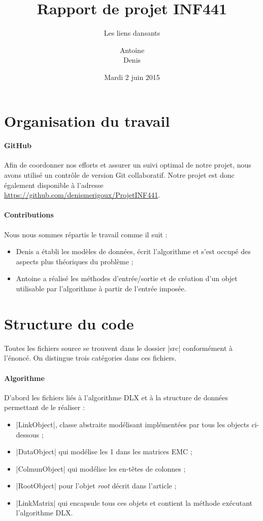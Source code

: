 \documentclass[11pt,french,a4paper]{article}
\title{Rapport de projet INF441}
\subtitle{Les liens dansants}
\author{Antoine \bsc{Berthier}\\ Denis \bsc{Merigoux}}
\date{Mardi 2 juin 2015}
\begin{document}
\maketitle

\section{Organisation du travail}

\paragraph{GitHub} Afin de coordonner nos efforts et assurer un suivi optimal de notre projet, nous avons utilisé un contrôle de version Git collaboratif. Notre projet est donc également disponible à l'adresse \url{https://github.com/denismerigoux/ProjetINF441}.

\paragraph{Contributions} Nous nous sommes répartis le travail comme il suit :
\begin{itemize}
	\item Denis a établi les modèles de données, écrit l'algorithme et s'est occupé des aspects plus théoriques du problème ;
	\item Antoine a réalisé les méthodes d'entrée/sortie et de création d'un objet utilisable par l'algorithme à partir de l'entrée imposée.
\end{itemize}

\section{Structure du code}

Toutes les fichiers source se trouvent dans le dossier |src| conformément à l'énoncé. On distingue trois catégories dans ces fichiers.

\paragraph{Algorithme} D'abord les fichiers liés à l'algorithme DLX et à la structure de données permettant de le réaliser :
\begin{itemize}
	\item |LinkObject|, classe abstraite modélisant implémentées par tous les objects ci-dessous ;
	\item |DataObject| qui modélise les 1 dans les matrices EMC ;
	\item |ColmunObject| qui modélise les en-têtes de colonnes ;
	\item |RootObject| pour l'objet \emph{root} décrit dans l'article ;
	\item |LinkMatrix| qui encapsule tous ces objets et contient la méthode exécutant l'algorithme DLX.
\end{itemize}
\end{document}

